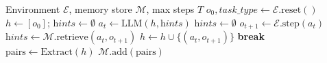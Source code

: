 \begin{algorithm}[t]
\caption{\method{} Episode Execution}
\label{alg:reactfm}
\begin{algorithmic}[1]
\REQUIRE Environment $\mathcal{E}$, memory store $\mathcal{M}$, max steps $T$
\STATE $o_0, \textit{task\_type} \leftarrow \mathcal{E}.\text{reset}()$
\STATE $h \leftarrow [o_0]$; $\textit{hints} \leftarrow \emptyset$
    \STATE $a_t \leftarrow \text{LLM}(h, \textit{hints})$ 
    \STATE $\textit{hints} \leftarrow \emptyset$ 
    \STATE $o_{t+1} \leftarrow \mathcal{E}.\text{step}(a_t)$
        \STATE $\textit{hints} \leftarrow \mathcal{M}.\text{retrieve}(a_t, o_{t+1})$ 
    \ENDIF
    \STATE $h \leftarrow h \cup \{(a_t, o_{t+1})\}$
        \STATE \textbf{break}
    \ENDIF
\ENDFOR
\STATE $\text{pairs} \leftarrow \text{Extract}(h)$ 
\STATE $\mathcal{M}.\text{add}(\text{pairs})$ 
\end{algorithmic}
\end{algorithm}
